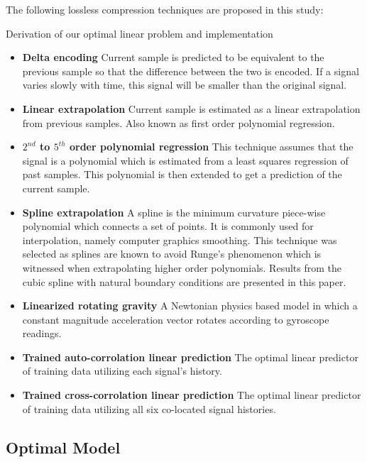 \documentclass[journal]{IEEEtran}
\begin{document}
The following lossless compression techniques are proposed in this study:

Derivation of our optimal linear problem and implementation

\begin{itemize}
  \item \textbf{Delta encoding} Current sample is predicted to be equivalent to the previous sample so that the difference between the two is encoded. If a signal varies slowly with time, this signal will be smaller than the original signal.
  \item \textbf{Linear extrapolation} Current sample is estimated as a linear extrapolation from previous samples. Also known as first order polynomial regression.
  \item \textbf{\boldmath$2^{nd}$ to \boldmath$5^{th}$ order polynomial regression} This technique assumes that the signal is a polynomial which is estimated from a least squares regression of past samples. This polynomial is then extended to get a prediction of the current sample.
  \item \textbf{Spline extrapolation} A spline is the minimum curvature piece-wise polynomial which connects a set of points. It is commonly used for interpolation, namely computer graphics smoothing. This technique was selected as splines are known to avoid Runge's phenomenon which is witnessed when extrapolating higher order polynomials. Results from the cubic spline with natural boundary conditions are presented in this paper.
  \item \textbf{Linearized rotating gravity} A Newtonian physics based model in which a constant magnitude acceleration vector rotates according to gyroscope readings.
  \item \textbf{Trained auto-corrolation linear prediction} The optimal linear predictor of training data utilizing each signal's history.
   \item \textbf{Trained cross-corrolation linear prediction} The optimal linear predictor of training data utilizing all six co-located signal histories.
\end{itemize}

\subsection{Optimal Model}
\end{document}
